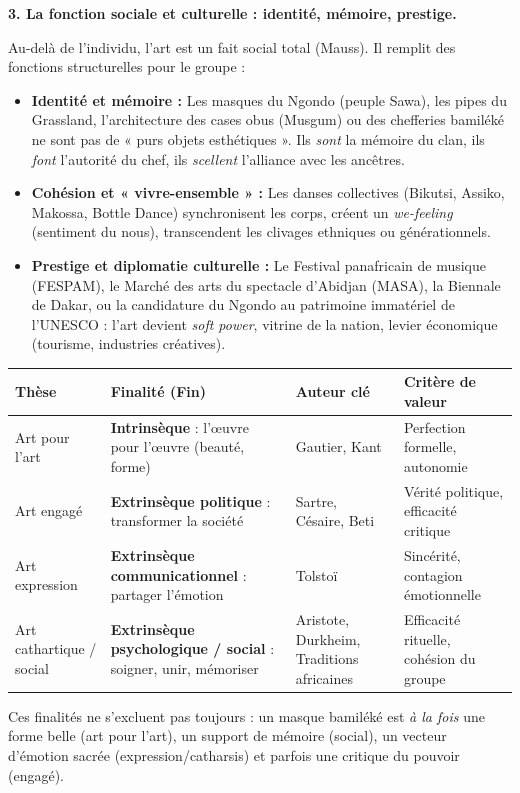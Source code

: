 \documentclass[11pt]{article}
\newcommand{\cle}[1]{{\popxbold\color{popdark}#1}}
\begin{document}
\textbf{3. La fonction sociale et culturelle : identité, mémoire, prestige.}\par
Au-delà de l'individu, l'art est un \cle{fait social total} (Mauss). Il remplit des fonctions structurelles pour le groupe :
\begin{itemize}
    \item \textbf{Identité et mémoire :} Les masques du Ngondo (peuple Sawa), les pipes du Grassland, l'architecture des cases obus (Musgum) ou des chefferies bamiléké ne sont pas de « purs objets esthétiques ». Ils \emph{sont} la mémoire du clan, ils \emph{font} l'autorité du chef, ils \emph{scellent} l'alliance avec les ancêtres.
    \item \textbf{Cohésion et « vivre-ensemble » :} Les danses collectives (Bikutsi, Assiko, Makossa, Bottle Dance) synchronisent les corps, créent un \emph{we-feeling} (sentiment du nous), transcendent les clivages ethniques ou générationnels.
    \item \textbf{Prestige et diplomatie culturelle :} Le Festival panafricain de musique (FESPAM), le Marché des arts du spectacle d'Abidjan (MASA), la Biennale de Dakar, ou la candidature du Ngondo au patrimoine immatériel de l'UNESCO : l'art devient \emph{soft power}, vitrine de la nation, levier économique (tourisme, industries créatives).
\end{itemize}

\begin{aretenir}
\begin{center}
\begin{tabularx}{\linewidth}{|l|X|X|l|}
\hline
\rowcolor{popblueL}
\textbf{Thèse} & \textbf{Finalité (Fin)} & \textbf{Auteur clé} & \textbf{Critère de valeur} \\
\hline
Art pour l'art & \textbf{Intrinsèque} : l'œuvre pour l'œuvre (beauté, forme) & Gautier, Kant & Perfection formelle, autonomie \\
\hline
Art engagé & \textbf{Extrinsèque politique} : transformer la société & Sartre, Césaire, Beti & Vérité politique, efficacité critique \\
\hline
Art expression & \textbf{Extrinsèque communicationnel} : partager l'émotion & Tolstoï & Sincérité, contagion émotionnelle \\
\hline
Art cathartique / social & \textbf{Extrinsèque psychologique / social} : soigner, unir, mémoriser & Aristote, Durkheim, Traditions africaines & Efficacité rituelle, cohésion du groupe \\
\hline
\end{tabularx}
\end{center}
Ces finalités ne s'excluent pas toujours : un masque bamiléké est \emph{à la fois} une forme belle (art pour l'art), un support de mémoire (social), un vecteur d'émotion sacrée (expression/catharsis) et parfois une critique du pouvoir (engagé).
\end{aretenir}
\end{document}
